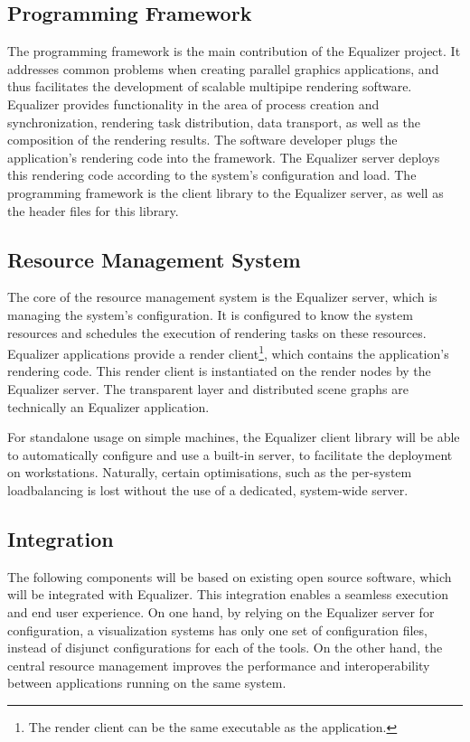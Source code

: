 \documentclass[10pt,a4paper]{scrartcl}
\begin{document}
\subsection{Programming Framework}

The programming framework is the main contribution of the Equalizer
project. It addresses common problems when creating parallel graphics
applications, and thus facilitates the development of scalable multipipe
rendering software. Equalizer provides functionality in the area of
process creation and synchronization, rendering task distribution, data
transport, as well as the composition of the rendering results. The
software developer plugs the application's rendering code into the
framework. The Equalizer server deploys this rendering code according to
the system's configuration and load. The programming framework is the
client library to the Equalizer server, as well as the header files for
this library.

\subsection{Resource Management System}

The core of the resource management system is the Equalizer server,
which is managing the system's configuration. It is configured to know
the system resources and schedules the execution of rendering tasks on
these resources. Equalizer applications provide a render
client\footnote{The render client can be the same executable as the
  application.}, which contains the application's rendering code. This
render client is instantiated on the render nodes by the Equalizer
server. The transparent layer and distributed scene graphs are
technically an Equalizer application.

For standalone usage on simple machines, the Equalizer client library
will be able to automatically configure and use a built-in server, to
facilitate the deployment on workstations. Naturally, certain
optimisations, such as the per-system loadbalancing is lost without the
use of a dedicated, system-wide server.

\subsection{Integration}
The following components will be based on existing open source software, which
will be integrated with Equalizer. This integration enables a seamless
execution and end user experience. On one hand, by relying on the
Equalizer server for configuration, a visualization systems has only
one set of configuration files, instead of disjunct configurations for
each of the tools. On the other hand, the central resource management improves
the performance and interoperability between applications running on
the same system.
\end{document}
